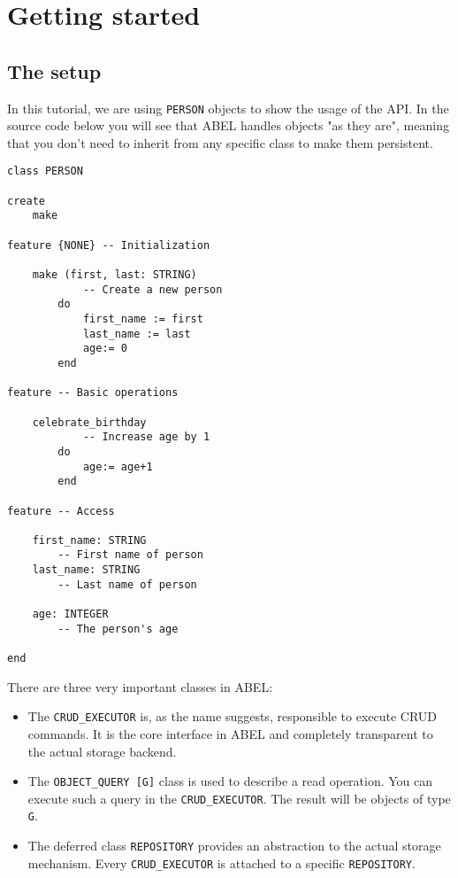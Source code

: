 
\section{Getting started}

\subsection{The setup}
In this tutorial, we are using \lstinline!PERSON! objects to show the usage of the API.
In the source code below you will see that ABEL handles objects "as they are", meaning that you don't need to inherit from any specific class to make them persistent.

\begin{lstlisting}[language=OOSC2Eiffel, captionpos=b, caption={The PERSON class}, label={lst:person_class}]
class PERSON

create
	make

feature {NONE} -- Initialization

	make (first, last: STRING)
			-- Create a new person
		do
			first_name := first
			last_name := last
			age:= 0
		end

feature -- Basic operations

	celebrate_birthday
			-- Increase age by 1
		do
			age:= age+1
		end

feature -- Access

	first_name: STRING
		-- First name of person
	last_name: STRING
		-- Last name of person

	age: INTEGER
		-- The person's age

end

\end{lstlisting}




There are three very important classes in ABEL:
\begin{itemize}
 \item The \lstinline!CRUD_EXECUTOR! is, as the name suggests, responsible to execute CRUD commands.
	It is the core interface in ABEL and completely transparent to the actual storage backend.

 \item The \lstinline!OBJECT_QUERY [G]! class is used to describe a read operation. 
	You can execute such a query in the \lstinline!CRUD_EXECUTOR!. 
	The result will be objects of type \lstinline!G!.

 \item The deferred class \lstinline!REPOSITORY! provides an abstraction to the actual storage mechanism.
	Every \lstinline!CRUD_EXECUTOR! is attached to a specific \lstinline!REPOSITORY!.
\end{itemize}

